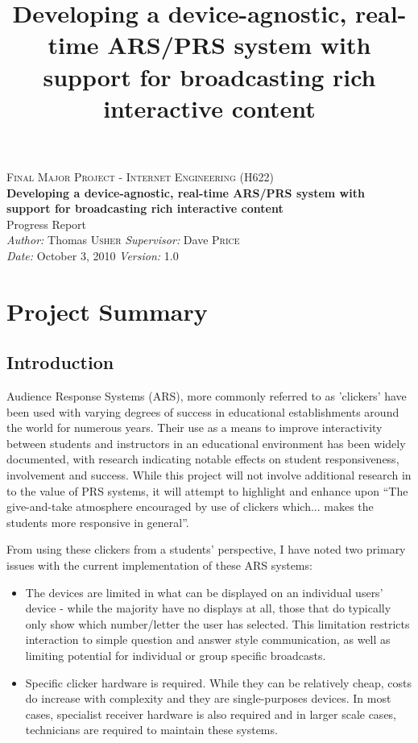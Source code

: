 \documentclass[a4papert,11pt,notitlepage]{ltxdoc}
\title{Developing a device-agnostic, real-time ARS/PRS system with support for
broadcasting rich interactive content}
\begin{document}
\begin{center}
\textsc{\Large Final Major Project - Internet Engineering (H622)}\\[0.3cm]
{\Large \bfseries Developing a device-agnostic, real-time ARS/PRS system with support for
broadcasting rich interactive content}\\[0.3cm]
{\Large Progress Report}\\[0.3cm]
\emph{Author:} Thomas \textsc{Usher} \hspace{1cm} \emph{Supervisor:} Dave \textsc{Price}\\
\emph{Date:} October 3, 2010 \hspace{1cm} \emph{Version:} 1.0
\end{center}
\tableofcontents

\section{Project Summary}
\subsection{Introduction}
Audience Response Systems (ARS), more commonly referred to as 'clickers' have been used with varying degrees of success in educational establishments around the world for numerous years. Their use as a means to improve interactivity between students and instructors in an educational environment has been widely documented, with research indicating notable effects on student responsiveness, involvement and success. While this project will not involve additional research in to the value of PRS systems, it will attempt to highlight and enhance upon ``The give-and-take atmosphere encouraged by use of clickers which... makes the students more responsive in general''\cite{wood:clickers}.

From using these clickers from a students' perspective, I have noted two primary issues with the current implementation of these ARS systems:
\begin{itemize}
\item The devices are limited in what can be displayed on an individual users' device - while the majority have no displays at all, those that do typically only show which number/letter the user has selected. This limitation restricts interaction to simple question and answer style communication, as well as limiting potential for individual or group specific broadcasts.
\item Specific clicker hardware is required. While they can be relatively cheap, costs do increase with complexity and they are single-purposes devices. In most cases, specialist receiver hardware is also required and in larger scale cases, technicians are required to maintain these systems.
\end{itemize}
\end{document}
